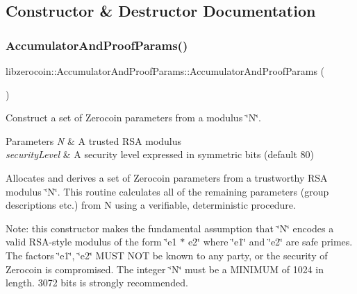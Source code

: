 \subsection{Constructor \& Destructor Documentation}
\mbox{\label{classlibzerocoin_1_1_accumulator_and_proof_params_ad5e69167694e5614940d89f3d1c5fbc5}} 
\subsubsection{\texorpdfstring{Accumulator\+And\+Proof\+Params()}{AccumulatorAndProofParams()}}
{\footnotesize\ttfamily libzerocoin\+::\+Accumulator\+And\+Proof\+Params\+::\+Accumulator\+And\+Proof\+Params (\begin{DoxyParamCaption}{ }\end{DoxyParamCaption})}



Construct a set of Zerocoin parameters from a modulus \char`\"{}\+N\char`\"{}. 


\begin{DoxyParams}{Parameters}
{\em N} & A trusted R\+SA modulus \\
\hline
{\em security\+Level} & A security level expressed in symmetric bits (default 80)\\
\hline
\end{DoxyParams}
Allocates and derives a set of Zerocoin parameters from a trustworthy R\+SA modulus \char`\"{}\+N\char`\"{}. This routine calculates all of the remaining parameters (group descriptions etc.) from N using a verifiable, deterministic procedure.

Note\+: this constructor makes the fundamental assumption that \char`\"{}\+N\char`\"{} encodes a valid R\+S\+A-\/style modulus of the form \char`\"{}e1 $\ast$ e2\char`\"{} where \char`\"{}e1\char`\"{} and \char`\"{}e2\char`\"{} are safe primes. The factors \char`\"{}e1\char`\"{}, \char`\"{}e2\char`\"{} M\+U\+ST N\+OT be known to any party, or the security of Zerocoin is compromised. The integer \char`\"{}\+N\char`\"{} must be a M\+I\+N\+I\+M\+UM of 1024 in length. 3072 bits is strongly recommended. 

